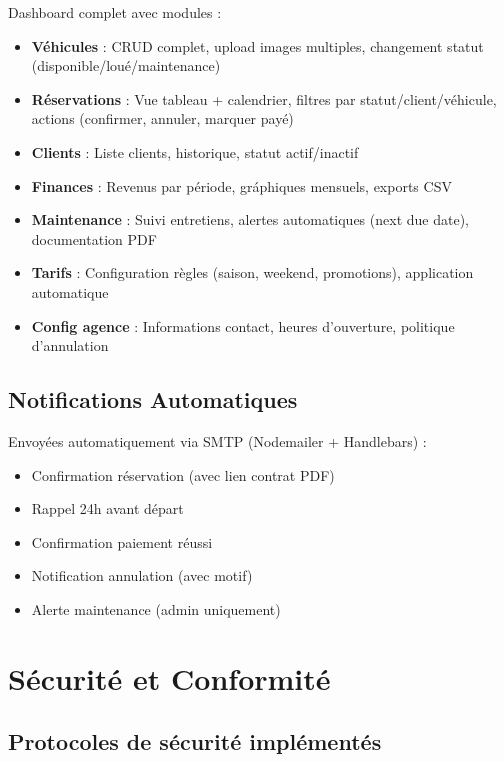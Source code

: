 \documentclass[12pt, a4paper]{article}
\begin{document}
Dashboard complet avec modules :
\begin{itemize}[leftmargin=*,noitemsep]
  \item \textbf{Véhicules} : CRUD complet, upload images multiples, changement statut (disponible/loué/maintenance)
  \item \textbf{Réservations} : Vue tableau + calendrier, filtres par statut/client/véhicule, actions (confirmer, annuler, marquer payé)
  \item \textbf{Clients} : Liste clients, historique, statut actif/inactif
  \item \textbf{Finances} : Revenus par période, gráphiques mensuels, exports CSV
  \item \textbf{Maintenance} : Suivi entretiens, alertes automatiques (next due date), documentation PDF
  \item \textbf{Tarifs} : Configuration règles (saison, weekend, promotions), application automatique
  \item \textbf{Config agence} : Informations contact, heures d'ouverture, politique d'annulation
\end{itemize}

\subsection{Notifications Automatiques}

Envoyées automatiquement via SMTP (Nodemailer + Handlebars) :
\begin{itemize}[leftmargin=*,noitemsep]
  \item Confirmation réservation (avec lien contrat PDF)
  \item Rappel 24h avant départ
  \item Confirmation paiement réussi
  \item Notification annulation (avec motif)
  \item Alerte maintenance (admin uniquement)
\end{itemize}

\section{Sécurité et Conformité}

\subsection{Protocoles de sécurité implémentés}
\end{document}
